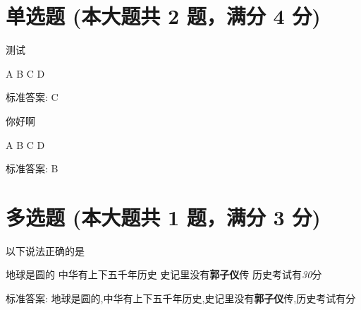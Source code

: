 \documentclass[12pt, a4paper, addpoints]{exam}
\begin{document}
\begin{center}
\end{center}
\vspace{5mm}

\normalsize
\vspace{5mm}

\section{单选题 (本大题共 2 题，满分 4 分)}
\hspace{1.5cm}
\begin{questions}
\question[2] 测试

\begin{oneparchoices}
\choice A
\choice B
\choice C
\choice D
\end{oneparchoices}

标准答案: C

\question[2] 你好啊

\begin{oneparchoices}
\choice A
\choice B
\choice C
\choice D
\end{oneparchoices}

标准答案: B

\end{questions}

\hspace{5cm}

\section{多选题 (本大题共 1 题，满分 3 分)}
\hspace{1.5cm}
\begin{questions}
\question[3] 以下说法正确的是

\begin{checkboxes}
\choice 地球是圆的
\choice 中华有上下五千年历史
\choice 史记里没有\textbf{郭子仪}传
\choice 历史考试有\textit{30}分
\end{checkboxes}

标准答案: 地球是圆的,中华有上下五千年历史,史记里没有\textbf{郭子仪}传,历史考试有\textit{}分

\end{questions}

\hspace{5cm}
\end{document}
